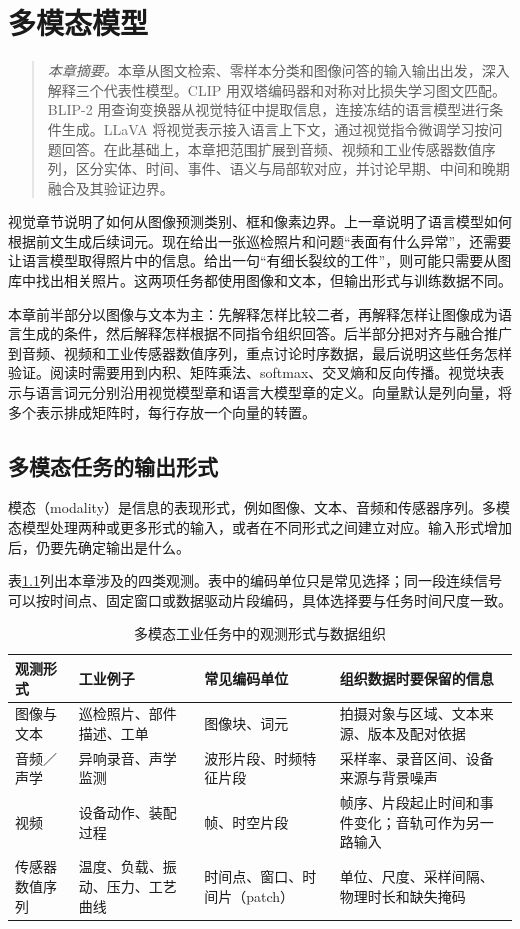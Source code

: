 \chapter{多模态模型}
\begin{quote}\small
\textit{本章摘要。}本章从图文检索、零样本分类和图像问答的输入输出出发，深入解释三个代表性模型。CLIP 用双塔编码器和对称对比损失学习图文匹配。\mbox{BLIP-2} 用查询变换器从视觉特征中提取信息，连接冻结的语言模型进行条件生成。LLaVA 将视觉表示接入语言上下文，通过视觉指令微调学习按问题回答。在此基础上，本章把范围扩展到音频、视频和工业传感器数值序列，区分实体、时间、事件、语义与局部软对应，并讨论早期、中间和晚期融合及其验证边界。
\end{quote}
视觉章节说明了如何从图像预测类别、框和像素边界。上一章说明了语言模型如何根据前文生成后续词元。现在给出一张巡检照片和问题“表面有什么异常”，还需要让语言模型取得照片中的信息。给出一句“有细长裂纹的工件”，则可能只需要从图库中找出相关照片。这两项任务都使用图像和文本，但输出形式与训练数据不同。

本章前半部分以图像与文本为主：先解释怎样比较二者，再解释怎样让图像成为语言生成的条件，然后解释怎样根据不同指令组织回答。后半部分把对齐与融合推广到音频、视频和工业传感器数值序列，重点讨论时序数据，最后说明这些任务怎样验证。阅读时需要用到内积、矩阵乘法、softmax、交叉熵和反向传播。视觉块表示与语言词元分别沿用视觉模型章和语言大模型章的定义。向量默认是列向量，将多个表示排成矩阵时，每行存放一个向量的转置。

\section{多模态任务的输出形式}
模态（modality）是信息的表现形式，例如图像、文本、音频和传感器序列。多模态模型处理两种或更多形式的输入，或者在不同形式之间建立对应。输入形式增加后，仍要先确定输出是什么。

表\ref{tab:multimodal-observation-range}列出本章涉及的四类观测。表中的编码单位只是常见选择；同一段连续信号可以按时间点、固定窗口或数据驱动片段编码，具体选择要与任务时间尺度一致。

\begin{table}[htbp]
\centering
\caption{多模态工业任务中的观测形式与数据组织}
\label{tab:multimodal-observation-range}
\small
\setlength{\tabcolsep}{3pt}
\begin{tabular}{@{}>{\raggedright\arraybackslash}m{1.8cm}>{\raggedright\arraybackslash}m{3.0cm}>{\raggedright\arraybackslash}m{3.0cm}>{\raggedright\arraybackslash}m{4.3cm}@{}}
\toprule
观测形式 & 工业例子 & 常见编码单位 & 组织数据时要保留的信息 \\
\midrule
图像与文本 & 巡检照片、部件描述、工单 & 图像块、词元 & 拍摄对象与区域、文本来源、版本及配对依据 \\
音频／声学 & 异响录音、声学监测 & 波形片段、时频特征片段 & 采样率、录音区间、设备来源与背景噪声 \\
视频 & 设备动作、装配过程 & 帧、时空片段 & 帧序、片段起止时间和事件变化；音轨可作为另一路输入 \\
传感器数值序列 & 温度、负载、振动、压力、工艺曲线 & 时间点、窗口、时间片（patch） & 单位、尺度、采样间隔、物理时长和缺失掩码 \\
\bottomrule
\end{tabular}
\end{table}

